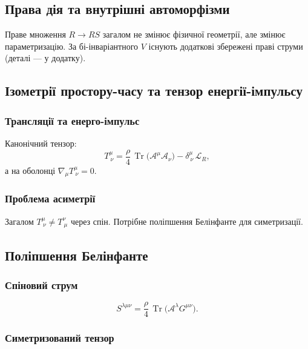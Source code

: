 \documentclass[11pt,a4paper]{article}
\numberwithin{equation}{section}
\theoremstyle{plain}
\theoremstyle{definition}
\theoremstyle{remark}
\DeclareMathOperator{\Tr}{Tr}
\begin{document}
\subsection{Права дія та внутрішні автоморфізми}

Праве множення $R\to RS$ загалом не змінює фізичної геометрії, але змінює параметризацію. За бі-інваріантного $V$ існують додаткові збережені праві струми (деталі — у додатку).

\subsection{Ізометрії простору-часу та тензор енергії-імпульсу}

\subsubsection{Трансляції та енерго-імпульс}

Канонічний тензор:
\begin{equation}
T^\mu_{\ \nu} = \frac{\rho}{4}\,\Tr\!\big(\mathcal{A}^\mu\mathcal{A}_\nu\big) - \delta^\mu_{\ \nu}\,\mathcal{L}_R,
\label{eq:canonicalT}
\end{equation}
а на оболонці $\nabla_\mu T^\mu_{\ \nu}=0$.

\subsubsection{Проблема асиметрії}

Загалом $T^\mu_{\ \nu}\neq T^\nu_{\ \mu}$ через спін. Потрібне поліпшення Белінфанте для симетризації.

\subsection{Поліпшення Белінфанте}

\subsubsection{Спіновий струм}

\begin{equation}
S^{\lambda\mu\nu} = \frac{\rho}{4}\,\Tr\!\big(\mathcal{A}^\lambda G^{\mu\nu}\big).
\label{eq:spin-tensor}
\end{equation}

\subsubsection{Симетризований тензор}
\end{document}
